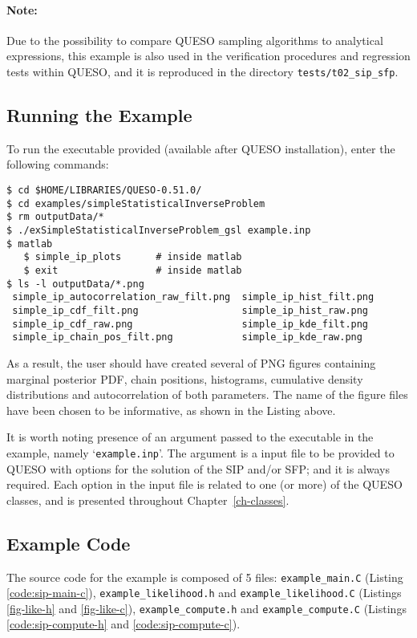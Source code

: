 \paragraph*{Note:} Due to the possibility to compare QUESO sampling algorithms to analytical expressions, this example is also used in the verification procedures and regression tests within QUESO, and it is reproduced in the directory \verb+tests/t02_sip_sfp+.




\subsection{Running the Example}\label{sec:sip-run}
 
To run the executable provided (available after QUESO installation), enter the following commands:
\begin{lstlisting}[label={},caption={}]
$ cd $HOME/LIBRARIES/QUESO-0.51.0/
$ cd examples/simpleStatisticalInverseProblem
$ rm outputData/*
$ ./exSimpleStatisticalInverseProblem_gsl example.inp    
$ matlab
   $ simple_ip_plots      # inside matlab
   $ exit                 # inside matlab
$ ls -l outputData/*.png
 simple_ip_autocorrelation_raw_filt.png  simple_ip_hist_filt.png 
 simple_ip_cdf_filt.png                  simple_ip_hist_raw.png
 simple_ip_cdf_raw.png                   simple_ip_kde_filt.png
 simple_ip_chain_pos_filt.png            simple_ip_kde_raw.png
\end{lstlisting}

As a result, the user should have created several of PNG figures containing marginal posterior PDF, chain positions, histograms, cumulative density distributions and autocorrelation of both parameters. The name of the figure files have been chosen to be informative, as shown in the Listing above. 

It is worth noting presence of an argument passed to the executable in the
example, namely `\verb+example.inp+'. The argument is a input file to be provided to QUESO with options for
the solution of the SIP and/or SFP; and it is always required. Each option in
the input file is related to one (or more) of the QUESO classes, and is
presented throughout Chapter~\ref{ch-classes}. 


\subsection{Example Code}\label{sec:sip-code}

The source code for the example is composed of 5 files:
\texttt{example\_main.C} (Listing \ref{code:sip-main-c}), \linebreak
\texttt{example\_likelihood.h} and \texttt{example\_likelihood.C} (Listings \ref{fig-like-h} and \ref{fig-like-c}),
\texttt{example\_compute.h} and \texttt{example\_compute.C} (Listings \ref{code:sip-compute-h} and \ref{code:sip-compute-c}).


